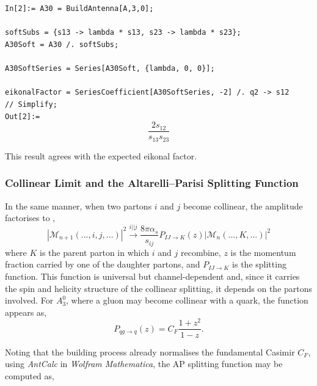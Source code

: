 \begin{mdframed}[backgroundcolor=gray!10, linewidth=0pt]
    \texttt{In[2]:= A30 = BuildAntenna[A,3,0];\\
                    \\
                    softSubs = \{s13 -> lambda * s13, s23 -> lambda * s23\};\\
                    A30Soft = A30 /. softSubs;\\
                    \\
                    A30SoftSeries = Series[A30Soft, \{lambda, 0, 0\}];\\
                    \\
                    eikonalFactor = SeriesCoefficient[A30SoftSeries, -2] /. q2 -> s12\\ 
                    // Simplify;}\\
    \hfill
    \texttt{Out[2]:=}
        \begin{equation*}
            \frac{2s_{12}}{s_{13}s_{23}}
        \end{equation*}
\end{mdframed}

This result agrees with the expected eikonal factor.

\subsubsection*{Collinear Limit and the Altarelli--Parisi Splitting Function}

In the same manner, when two partons $i$ and $j$ become collinear, the amplitude 
factorises to \cite{Catani:1996vz,Altarelli:1977zs},
\begin{equation}
    |\mathcal M_{n+1}(...,i,j,...)|^2\xrightarrow{i||j}\frac{8\pi\alpha_s}{s_{ij}}P_{IJ\to K}(z)|\mathcal M_n(...,K,...)|^2
\end{equation}
where $K$ is the parent parton in which $i$ and $j$ recombine, $z$ is the momentum fraction 
carried by one of the daughter partons, and $P_{IJ\to K}$ is the splitting function. This function
is universal but channel-dependent and, since it carries the spin and helicity 
structure of the collinear 
splitting, it depends on the partons involved. For $A_3^0$, where a gluon may become 
collinear with a quark, the function appears as,
\begin{equation}
    P_{qg\to q}(z) = C_F\frac{1+z^2}{1-z}.
\end{equation}

Noting that the building process already normalises the fundamental Casimir $C_F$, using 
\textit{AntCalc} in \textit{Wolfram Mathematica}, the AP splitting function may be 
computed as,

